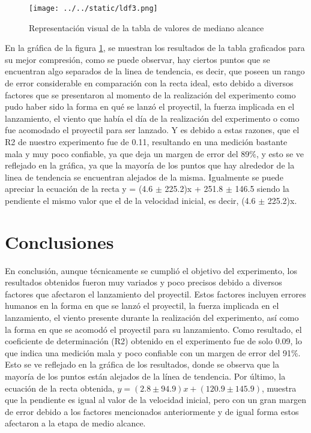 \documentclass{article}
\begin{document}
\begin{figure}[h]
	\centering
	\texttt{[image: ../../static/ldf3.png]}
	\caption{Representación visual de la tabla de valores de mediano alcance}
	\label{fig:3}
\end{figure}

En la gráfica de la figura \ref{fig:3}, se muestran los resultados de la tabla graficados para su mejor compresión, como se puede observar, hay ciertos puntos que se encuentran algo separados de la linea de tendencia, es decir, que poseen un rango de error considerable en comparación con la recta ideal, esto debido a diversos factores que se presentaron al momento de la realización del experimento como pudo haber sido la forma en qué se lanzó el proyectil, la fuerza implicada en el lanzamiento, el viento que había el día de la realización del experimento o como fue acomodado el proyectil para ser lanzado. Y es debido a estas razones, que el R2 de nuestro experimento fue de 0.11, resultando en una medición bastante mala y muy poco confiable, ya que deja un margen de error del 89$\%$, y esto se ve reflejado en la gráfica, ya que la mayoría de los puntos que hay alrededor de la linea de tendencia se encuentran alejados de la misma. Igualmente se puede apreciar la ecuación de la recta y = (4.6 $\pm$ 225.2)x + 251.8 $\pm$ 146.5 siendo la pendiente el mismo valor que el de la velocidad inicial, es decir, (4.6 $\pm$ 225.2)x.

\section{Conclusiones}\label{Conclusiones}				%

En conclusión, aunque técnicamente se cumplió el objetivo del experimento, los resultados obtenidos fueron muy variados y poco precisos debido a diversos factores que afectaron el lanzamiento del proyectil. Estos factores incluyen errores humanos en la forma en que se lanzó el proyectil, la fuerza implicada en el lanzamiento, el viento presente durante la realización del experimento, así como la forma en que se acomodó el proyectil para su lanzamiento. Como resultado, el coeficiente de determinación (R2) obtenido en el experimento fue de solo 0.09, lo que indica una medición mala y poco confiable con un margen de error del 91$\%$. Esto se ve reflejado en la gráfica de los resultados, donde se observa que la mayoría de los puntos están alejados de la línea de tendencia. Por último, la ecuación de la recta obtenida, $y = (2.8 \pm 94.9)x + (120.9 \pm 145.9)$, muestra que la pendiente es igual al valor de la velocidad inicial, pero con un gran margen de error debido a los factores mencionados anteriormente y de igual forma estos afectaron a la etapa de medio alcance.
\end{document}
